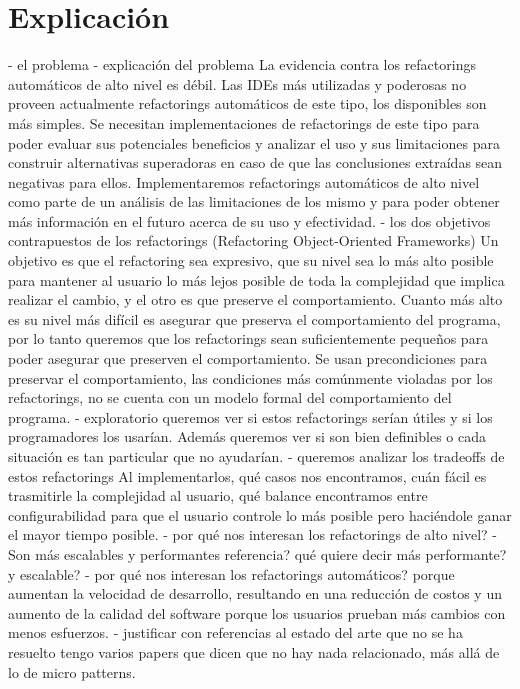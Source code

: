 \section{Explicación}

- el problema
    - explicación del problema
      La evidencia contra los refactorings automáticos de alto nivel es débil. Las IDEs más utilizadas y poderosas no proveen actualmente refactorings automáticos de este tipo, los disponibles son más simples. Se necesitan implementaciones de refactorings de este tipo para poder evaluar sus potenciales beneficios y analizar el uso y sus limitaciones para construir alternativas superadoras en caso de que las conclusiones extraídas sean negativas para ellos.
Implementaremos refactorings automáticos de alto nivel como parte de un análisis de las limitaciones de los mismo y para poder obtener más información en el futuro acerca de su uso y efectividad.
        - los dos objetivos contrapuestos de los refactorings
          (Refactoring Object-Oriented Frameworks) Un objetivo es que el refactoring sea expresivo, que su nivel sea lo más alto posible para mantener al usuario lo más lejos posible de toda la complejidad que implica realizar el cambio, y el otro es que preserve el comportamiento. Cuanto más alto es su nivel más difícil es asegurar que preserva el comportamiento del programa, por lo tanto queremos que los refactorings sean suficientemente pequeños para poder asegurar que preserven el comportamiento. Se usan precondiciones para preservar el comportamiento, las condiciones más comúnmente violadas por los refactorings, no se cuenta con un modelo formal del comportamiento del programa. 
        - exploratorio
          queremos ver si estos refactorings serían útiles y si los programadores los usarían. Además queremos ver si son bien definibles o cada situación es tan particular que no ayudarían.
            - queremos analizar los tradeoffs de estos refactorings
              Al implementarlos, qué casos nos encontramos, cuán fácil es trasmitirle la complejidad al usuario, qué balance encontramos entre configurabilidad para que el usuario controle lo más posible pero haciéndole ganar el mayor tiempo posible. 
        - por qué nos interesan los refactorings de alto nivel?
            - Son más escalables y performantes
              referencia? qué quiere decir más performante? y escalable?
        - por qué nos interesan los refactorings automáticos?
          porque aumentan la velocidad de desarrollo, resultando en una reducción de costos y un aumento de la calidad del software porque los usuarios prueban más cambios con menos esfuerzos.
    - justificar con referencias al estado del arte que no se ha resuelto
      tengo varios papers que dicen que no hay nada relacionado, más allá de lo de micro patterns.

